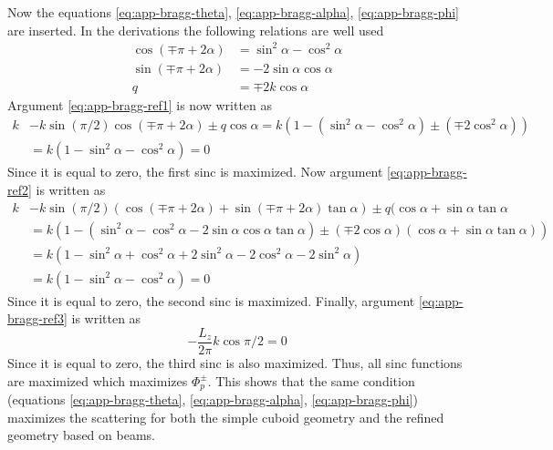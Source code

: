 \documentclass[11pt,twoside]{eitExjobb}
\begin{document}
Now the equations \eqref{eq:app-bragg-theta}, \eqref{eq:app-bragg-alpha}, \eqref{eq:app-bragg-phi} are inserted. In the derivations the following relations are well used
\begin{align*}
	\cos(\mp \pi + 2\alpha) &= \sin^2{\alpha} - \cos^2{\alpha} \\
	\sin(\mp \pi + 2\alpha) &= -2\sin{\alpha}\cos{\alpha} \\
	q &= \mp 2k\cos{\alpha}
\end{align*}
Argument \eqref{eq:app-bragg-ref1} is now written as
\begin{equation*}
\begin{split}
	k &- k\sin(\pi/2)\cos(\mp \pi + 2\alpha) \pm q\cos{\alpha} = k \left( 1 - (\sin^2{\alpha} - \cos^2{\alpha}) \pm (\mp 2\cos^2{\alpha}) \right) \\
	&= k \left( 1 - \sin^2{\alpha} - \cos^2{\alpha} \right) = 0
\end{split}
\end{equation*}
Since it is equal to zero, the first sinc is maximized. Now argument \eqref{eq:app-bragg-ref2} is written as
\begin{equation*}
\begin{split}
	k &- k\sin(\pi/2)(\cos(\mp \pi + 2\alpha) + \sin(\mp \pi + 2\alpha)\tan{\alpha}) \pm q(\cos{\alpha} + \sin{\alpha}\tan{\alpha} \\
	&= k \left( 1 - (\sin^2{\alpha} - \cos^2{\alpha} - 2\sin{\alpha}\cos{\alpha}\tan{\alpha}) \pm (\mp 2\cos{\alpha})(\cos{\alpha} + \sin{\alpha}\tan{\alpha}) \right) \\
	&= k \left( 1 - \sin^2{\alpha} + \cos^2{\alpha} + 2\sin^2{\alpha} - 2\cos^2{\alpha} - 2\sin^2{\alpha} \right) \\
	&= k \left( 1 - \sin^2{\alpha} - \cos^2{\alpha} \right) = 0
\end{split}
\end{equation*}
Since it is equal to zero, the second sinc is maximized. Finally, argument \eqref{eq:app-bragg-ref3} is written as
\begin{equation*}
	-\frac{L_z}{2\pi} k\cos{\pi/2} = 0
\end{equation*}
Since it is equal to zero, the third sinc is also maximized. Thus, all sinc functions are maximized which maximizes $\Phi_p^{\pm}$. This shows that the same condition (equations \eqref{eq:app-bragg-theta}, \eqref{eq:app-bragg-alpha}, \eqref{eq:app-bragg-phi}) maximizes the scattering for both the simple cuboid geometry and the refined geometry based on beams. 
	
\end{document}
